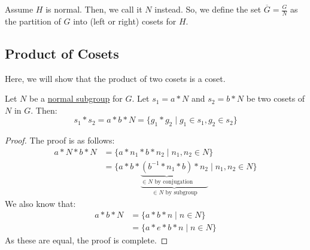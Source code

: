 \documentclass[letterpaper]{article}
\begin{document}
\bigskip 

Assume $H$ is normal. Then, we call it $N$ instead. So, we define the set $\overline{G} = \frac{G}{N}$ as the partition of $G$ into (left or right) cosets for $H$. 

\subsection{Product of Cosets}
Here, we will show that the product of two cosets is a coset. 
\begin{lemma}{}{}
    Let $N$ be a \underline{normal subgroup} for $G$. Let $s_1 = a * N$ and $s_2 = b * N$ be two cosets of $N$ in $G$. Then: 
    \[s_1 * s_2 = \boxed{a * b * N} = \{g_1 * g_2 \mid g_1 \in s_1, g_2 \in s_2\}\]
\end{lemma}

\begin{mdframed}
    \begin{proof}
        The proof is as follows: 
        \begin{equation*}
            \begin{aligned}
                a * N * b * N &= \{a * n_1 * b * n_2 \mid n_1, n_2 \in N\} \\
                    &= \{a * b * \underbrace{\underbrace{(b^{-1} * n_1 * b)}_{\in N \text{ by conjugation}} * n_2}_{\in N \text{ by subgroup}} \mid n_1, n_2 \in N\}
            \end{aligned}
        \end{equation*}
        We also know that: 
        \begin{equation*}
            \begin{aligned}
                a * b * N &= \{a * b * n \mid n \in N\} \\ 
                    &= \{a * e * b * n \mid n \in N\}
            \end{aligned}
        \end{equation*}
        As these are equal, the proof is complete. 
    \end{proof}    
\end{mdframed}
\end{document}
